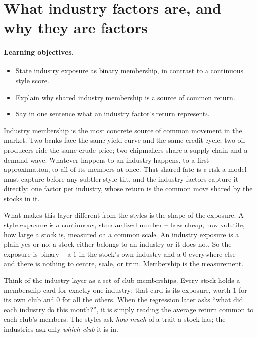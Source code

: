 \documentclass[11pt]{article}
\theoremstyle{definition}
\theoremstyle{plain}
\theoremstyle{remark}
\begin{document}
\tableofcontents
\bigskip

\section{What industry factors are, and why they are factors}\label{sec:what}

\paragraph{Learning objectives.}
\begin{itemize}[leftmargin=1.4em,topsep=2pt]
  \item State industry exposure as binary membership, in contrast to a continuous style score.
  \item Explain why shared industry membership is a source of common return.
  \item Say in one sentence what an industry factor's return represents.
\end{itemize}

Industry membership is the most concrete source of common movement in the market. Two banks face the same yield curve and the same credit cycle; two oil producers ride the same crude price; two chipmakers share a supply chain and a demand wave. Whatever happens to an industry happens, to a first approximation, to all of its members at once. That shared fate is a risk a model must capture before any subtler style tilt, and the industry factors capture it directly: one factor per industry, whose return is the common move shared by the stocks in it.

What makes this layer different from the styles is the shape of the exposure. A style exposure is a continuous, standardized number -- how cheap, how volatile, how large a stock is, measured on a common scale. An industry exposure is a plain yes-or-no: a stock either belongs to an industry or it does not. So the exposure is binary -- a $1$ in the stock's own industry and a $0$ everywhere else -- and there is nothing to centre, scale, or trim. Membership is the measurement.

\begin{intuition}
Think of the industry layer as a set of club memberships. Every stock holds a membership card for exactly one industry; that card is its exposure, worth $1$ for its own club and $0$ for all the others. When the regression later asks ``what did each industry do this month?'', it is simply reading the average return common to each club's members. The styles ask \emph{how much} of a trait a stock has; the industries ask only \emph{which club} it is in.
\end{intuition}
\end{document}
